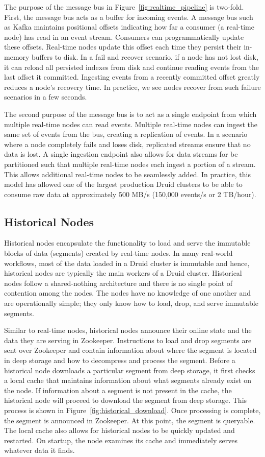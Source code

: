 \documentclass{acm_proc_article-sp}
\begin{document}
The purpose of the message bus in Figure~\ref{fig:realtime_pipeline} is
two-fold.  First, the message bus acts as a buffer for incoming events. A
message bus such as Kafka maintains positional offsets indicating how far a
consumer (a real-time node) has read in an event stream. Consumers can
programmatically update these offsets. Real-time nodes update this offset each
time they persist their in-memory buffers to disk. In a fail and recover
scenario, if a node has not lost disk, it can reload all persisted indexes from
disk and continue reading events from the last offset it committed. Ingesting
events from a recently committed offset greatly reduces a node's recovery time.
In practice, we see nodes recover from such failure scenarios in a
few seconds.

The second purpose of the message bus is to act as a single endpoint from which
multiple real-time nodes can read events. Multiple real-time nodes can ingest
the same set of events from the bus, creating a replication of events. In a
scenario where a node completely fails and loses disk, replicated streams
ensure that no data is lost. A single ingestion endpoint also allows for data
streams for be partitioned such that multiple real-time nodes each ingest a
portion of a stream. This allows additional real-time nodes to be seamlessly
added. In practice, this model has allowed one of the largest production Druid
clusters to be able to consume raw data at approximately 500 MB/s (150,000
events/s or 2 TB/hour).

\subsection{Historical Nodes}
Historical nodes encapsulate the functionality to load and serve the immutable
blocks of data (segments) created by real-time nodes. In many real-world
workflows, most of the data loaded in a Druid cluster is immutable and hence,
historical nodes are typically the main workers of a Druid cluster.  Historical
nodes follow a shared-nothing architecture and there is no single point of
contention among the nodes. The nodes have no knowledge of one another and are
operationally simple; they only know how to load, drop, and serve immutable
segments. 

Similar to real-time nodes, historical nodes announce their online state and
the data they are serving in Zookeeper. Instructions to load and drop segments
are sent over Zookeeper and contain information about where the segment is
located in deep storage and how to decompress and process the segment.  Before
a historical node downloads a particular segment from deep storage, it first
checks a local cache that maintains information about what segments already
exist on the node.  If information about a segment is not present in the cache,
the historical node will proceed to download the segment from deep storage.
This process is shown in Figure~\ref{fig:historical_download}. Once processing
is complete, the segment is announced in Zookeeper.  At this point, the segment
is queryable. The local cache also allows for historical nodes to be quickly
updated and restarted. On startup, the node examines its cache and immediately
serves whatever data it finds.
\end{document}
